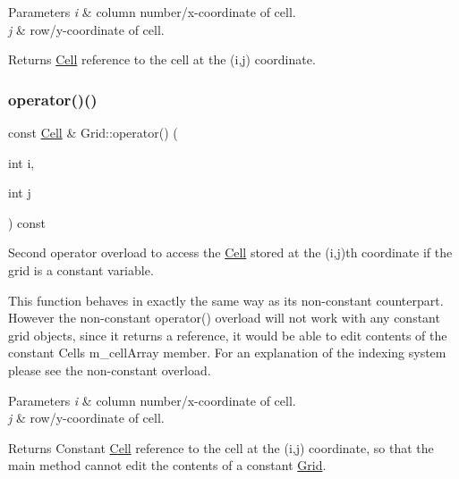 \begin{DoxyParams}{Parameters}
{\em i} & column number/x-\/coordinate of cell.\\
\hline
{\em j} & row/y-\/coordinate of cell.\\
\hline
\end{DoxyParams}
\begin{DoxyReturn}{Returns}
\hyperlink{class_cell}{Cell} reference to the cell at the (i,j) coordinate. 
\end{DoxyReturn}
\mbox{\label{class_grid_aa89f5c17cb78658f3b82a3b2d93aeb92}} 
\subsubsection{\texorpdfstring{operator()()}{operator()()}\hspace{0.1cm}{\footnotesize\ttfamily [2/2]}}
{\footnotesize\ttfamily const \hyperlink{class_cell}{Cell} \& Grid\+::operator() (\begin{DoxyParamCaption}\item[{int}]{i,  }\item[{int}]{j }\end{DoxyParamCaption}) const}



Second operator overload to access the \hyperlink{class_cell}{Cell} stored at the (i,j)th coordinate if the grid is a constant variable. 

This function behaves in exactly the same way as its non-\/constant counterpart. However the non-\/constant operator() overload will not work with any constant grid objects, since it returns a reference, it would be able to edit contents of the constant Cells m\+\_\+cell\+Array member. For an explanation of the indexing system please see the non-\/constant overload.


\begin{DoxyParams}{Parameters}
{\em i} & column number/x-\/coordinate of cell.\\
\hline
{\em j} & row/y-\/coordinate of cell.\\
\hline
\end{DoxyParams}
\begin{DoxyReturn}{Returns}
Constant \hyperlink{class_cell}{Cell} reference to the cell at the (i,j) coordinate, so that the main method cannot edit the contents of a constant \hyperlink{class_grid}{Grid}. 
\end{DoxyReturn}
\mbox{\label{class_grid_aae7b118be13f65bf2e3a72881d8a06df}} 
